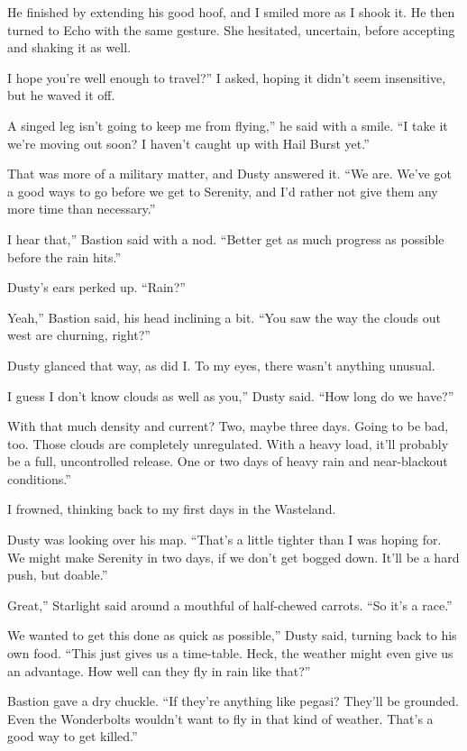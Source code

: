 He finished by extending his good hoof, and I smiled more as I shook it. He then turned to Echo with the same gesture. She hesitated, uncertain, before accepting and shaking it as well.

\leavevmode{}I hope you’re well enough to travel?” I asked, hoping it didn’t seem insensitive, but he waved it off.

\leavevmode{}A singed leg isn’t going to keep me from flying,” he said with a smile. “I take it we’re moving out soon? I haven’t caught up with Hail Burst yet.”

That was more of a military matter, and Dusty answered it. “We are. We’ve got a good ways to go before we get to Serenity, and I’d rather not give them any more time than necessary.”

\leavevmode{}I hear that,” Bastion said with a nod. “Better get as much progress as possible before the rain hits.”

Dusty’s ears perked up. “Rain?”

\leavevmode{}Yeah,” Bastion said, his head inclining a bit. “You saw the way the clouds out west are churning, right?”

Dusty glanced that way, as did I. To my eyes, there wasn’t anything unusual.

\leavevmode{}I guess I don’t know clouds as well as you,” Dusty said. “How long do we have?”

\leavevmode{}With that much density and current? Two, maybe three days. Going to be bad, too. Those clouds are completely unregulated. With a heavy load, it’ll probably be a full, uncontrolled release. One or two days of heavy rain and near-blackout conditions.”

I frowned, thinking back to my first days in the Wasteland.

Dusty was looking over his map. “That’s a little tighter than I was hoping for. We might make Serenity in two days, if we don’t get bogged down. It’ll be a hard push, but doable.”

\leavevmode{}Great,” Starlight said around a mouthful of half-chewed carrots. “So it’s a race.”

\leavevmode{}We wanted to get this done as quick as possible,” Dusty said, turning back to his own food. “This just gives us a time-table. Heck, the weather might even give us an advantage. How well can they fly in rain like that?”

Bastion gave a dry chuckle. “If they’re anything like pegasi? They’ll be grounded. Even the Wonderbolts wouldn’t want to fly in that kind of weather. That’s a good way to get killed.”

